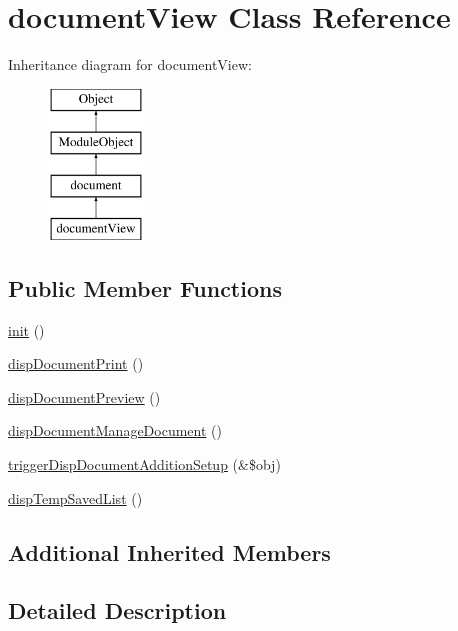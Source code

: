 \hypertarget{classdocumentView}{\section{document\-View Class Reference}
\label{classdocumentView}
}
Inheritance diagram for document\-View\-:\begin{figure}[H]
\begin{center}
\leavevmode
\includegraphics[height=4.000000cm]{classdocumentView}
\end{center}
\end{figure}
\subsection*{Public Member Functions}
\begin{DoxyCompactItemize}
\item 
\hyperlink{classdocumentView_a198da8ed86ff84d45687f2783113b799}{init} ()
\item 
\hyperlink{classdocumentView_aab058bbbfedaeb2d9b6bb1505d5e3b9c}{disp\-Document\-Print} ()
\item 
\hyperlink{classdocumentView_af93051602dbf3254f05d1d0ada402907}{disp\-Document\-Preview} ()
\item 
\hyperlink{classdocumentView_a5a358d7106e98e64179115b3966639de}{disp\-Document\-Manage\-Document} ()
\item 
\hyperlink{classdocumentView_a0ea8992b5f032e29e528cbb9ab1b709c}{trigger\-Disp\-Document\-Addition\-Setup} (\&\$obj)
\item 
\hyperlink{classdocumentView_a849d0bdc714a0ea2fd23bbe86f2fde6f}{disp\-Temp\-Saved\-List} ()
\end{DoxyCompactItemize}
\subsection*{Additional Inherited Members}


\subsection{Detailed Description}


